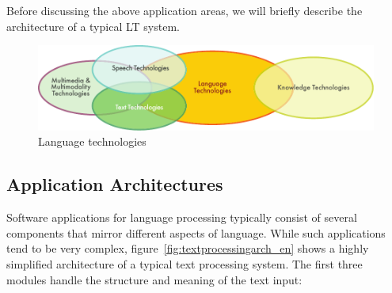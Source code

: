 \begin{multicols}{2}
Before discussing the above application areas, we will briefly describe the architecture of a typical LT system.


\begin{figure}[htb]
  \center
  \includegraphics[width=\textwidth]{../_media/english/language_technologies}
  \caption{Language technologies}
  \label{fig:ltincontext_en}
\end{figure}

\subsection{Application Architectures}

Software applications for language processing typically consist of several components that mirror different aspects of language. While such applications tend to be very complex, figure~\ref{fig:textprocessingarch_en} shows a highly simplified architecture of a typical text processing system. The first three modules handle the structure and meaning of the text input:


\end{multicols}
